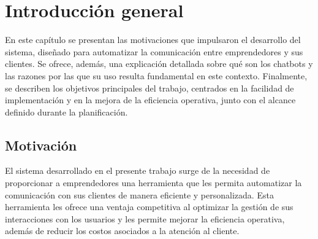 
\chapter{Introducción general} %

\label{Chapter1} %
\label{IntroGeneral}



\newcommand{\keyword}[1]{\textbf{#1}}
\newcommand{\tabhead}[1]{\textbf{#1}}
\newcommand{\code}[1]{\texttt{#1}}
\newcommand{\file}[1]{\texttt{\bfseries#1}}
\newcommand{\option}[1]{\texttt{\itshape#1}}
\newcommand{\grados}{$^{\circ}$}



En este capítulo se presentan las motivaciones que impulsaron el desarrollo del sistema, diseñado para automatizar la comunicación entre emprendedores y sus clientes. Se ofrece, además, una explicación detallada sobre qué son los chatbots y las razones por las que su uso resulta fundamental en este contexto. Finalmente, se describen los objetivos principales del trabajo, centrados en la facilidad de implementación y en la mejora de la eficiencia operativa, junto con el alcance definido durante la planificación.

\section{Motivación{}}

El sistema desarrollado en el presente trabajo surge de la necesidad de proporcionar a emprendedores una herramienta que les permita automatizar la comunicación con sus clientes de manera eficiente y personalizada. Esta herramienta les ofrece una ventaja competitiva al optimizar la gestión de sus interacciones con los usuarios y les permite mejorar la eficiencia operativa, además de reducir los costos asociados a la atención al cliente.


